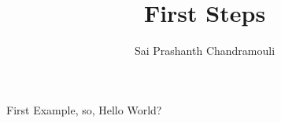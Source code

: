 \documentclass[a4paper,62pt]{article}
\author{Sai Prashanth Chandramouli}
\title{First Steps}
\begin{document}
	\maketitle
	First Example, so, Hello World?
	\tableofcontents
	
\end{document}
